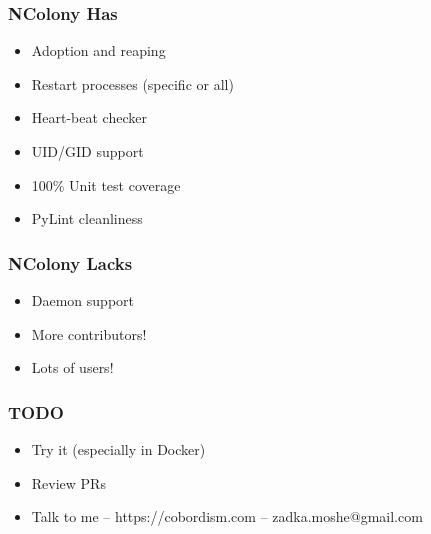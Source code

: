 \documentclass{beamer}
\begin{document}
\begin{frame}[fragile]
\frametitle{NColony Has}
\begin{itemize}
\item Adoption and reaping \pause
\item Restart processes (specific or all) \pause
\item Heart-beat checker \pause
\item UID/GID support \pause
\item 100\% Unit test coverage \pause
\item PyLint cleanliness
\end{itemize}
\end{frame}

\begin{frame}[fragile]
\frametitle{NColony Lacks}
\begin{itemize}
\item Daemon support \pause
\item More contributors! \pause
\item Lots of users!
\end{itemize}
\end{frame}

\begin{frame}[fragile]
\frametitle{TODO}
\begin{itemize}
\item Try it (especially in Docker) \pause
\item Review PRs \pause
\item Talk to me -- https://cobordism.com -- zadka.moshe@gmail.com
\end{itemize}
\end{frame}
\end{document}
